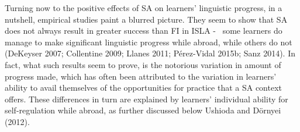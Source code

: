 \documentclass[12pt]{article}
\newenvironment{styleStandard}{\setlength\leftskip{0cm}\setlength\rightskip{0cm plus 1fil}\setlength\parindent{0cm}\setlength\parfillskip{0pt plus 1fil}\setlength\parskip{0in plus 1pt}\writerlistparindent\writerlistleftskip\leavevmode\normalfont\normalsize\writerlistlabel\ignorespaces}{\unskip\vspace{0.111in plus 0.0111in}\par}
\newcommand\writerlistleftskip{}
\newcommand\writerlistparindent{}
\newcommand\writerlistlabel{}
\begin{document}
\begin{styleStandard}
Turning now to the positive effects of SA on learners’ linguistic progress, in a nutshell, empirical studies paint a blurred picture. They seem to show that SA does not always result in greater success than FI in ISLA - \ some learners do manage to make significant linguistic progress while abroad, while others do not (DeKeyser 2007; Collentine 2009; Llanes 2011; Pérez-Vidal 2015b; Sanz 2014). In fact, what such results seem to prove, is the notorious variation in amount of progress made, which has often been attributed to the variation in learners’ ability to avail themselves of the opportunities for practice that a SA context offers. These differences in turn are explained by learners’ individual ability for self-regulation while abroad, as further discussed below Ushioda and Dörnyei (2012). 
\end{styleStandard}
\end{document}
